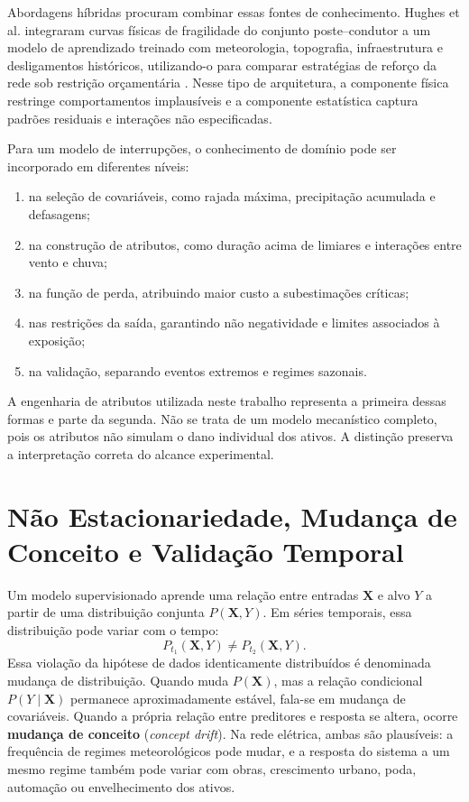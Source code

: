 Abordagens híbridas procuram combinar essas fontes de conhecimento. Hughes et al. integraram curvas físicas de fragilidade do conjunto poste--condutor a um modelo de aprendizado treinado com meteorologia, topografia, infraestrutura e desligamentos históricos, utilizando-o para comparar estratégias de reforço da rede sob restrição orçamentária \cite{hughes2024hardening}. Nesse tipo de arquitetura, a componente física restringe comportamentos implausíveis e a componente estatística captura padrões residuais e interações não especificadas.

Para um modelo de interrupções, o conhecimento de domínio pode ser incorporado em diferentes níveis:
\begin{enumerate}
    \item na seleção de covariáveis, como rajada máxima, precipitação acumulada e defasagens;
    \item na construção de atributos, como duração acima de limiares e interações entre vento e chuva;
    \item na função de perda, atribuindo maior custo a subestimações críticas;
    \item nas restrições da saída, garantindo não negatividade e limites associados à exposição;
    \item na validação, separando eventos extremos e regimes sazonais.
\end{enumerate}
A engenharia de atributos utilizada neste trabalho representa a primeira dessas formas e parte da segunda. Não se trata de um modelo mecanístico completo, pois os atributos não simulam o dano individual dos ativos. A distinção preserva a interpretação correta do alcance experimental.

\section{Não Estacionariedade, Mudança de Conceito e Validação Temporal}\label{sec:drift_validacao}

Um modelo supervisionado aprende uma relação entre entradas $\mathbf{X}$ e alvo $Y$ a partir de uma distribuição conjunta $P(\mathbf{X},Y)$. Em séries temporais, essa distribuição pode variar com o tempo:
\begin{equation}
    P_{t_1}(\mathbf{X},Y)\neq P_{t_2}(\mathbf{X},Y).
    \label{eq:drift_distribuicao}
\end{equation}
Essa violação da hipótese de dados identicamente distribuídos é denominada mudança de distribuição. Quando muda $P(\mathbf{X})$, mas a relação condicional $P(Y\mid\mathbf{X})$ permanece aproximadamente estável, fala-se em mudança de covariáveis. Quando a própria relação entre preditores e resposta se altera, ocorre \textbf{mudança de conceito} (\textit{concept drift}). Na rede elétrica, ambas são plausíveis: a frequência de regimes meteorológicos pode mudar, e a resposta do sistema a um mesmo regime também pode variar com obras, crescimento urbano, poda, automação ou envelhecimento dos ativos.

